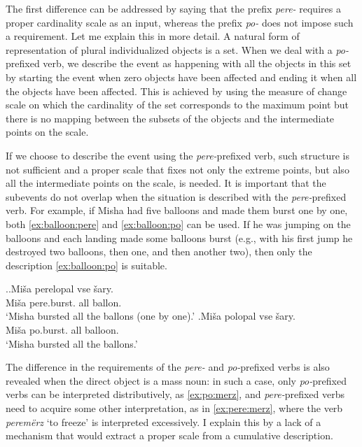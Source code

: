 The first difference can be addressed by saying that the prefix \textit{pere-} requires a proper cardinality scale as an input, whereas the prefix \textit{po-} does not impose such a requirement. Let me explain this in more detail. A natural form of representation of plural individualized objects is a set. When we deal with a \textit{po-}prefixed verb, we describe the event as happening with all the objects in this set by starting the event when zero objects have been affected and ending it when all the objects have been affected. This is achieved by using the measure of change scale on which the cardinality of the set corresponds to the maximum point but there is no mapping between the subsets of the objects and the intermediate points on the scale.

If we choose to describe the event using the \textit{pere-}prefixed verb, such structure is not sufficient and a proper scale that fixes not only the extreme points, but also all the intermediate points on the scale, is needed. It is important that the subevents do not overlap when the situation is described with the \textit{pere-}prefixed verb. For example, if Misha had five balloons and made them burst one by one, both \ref{ex:balloon:pere} and \ref{ex:balloon:po} can be used. If he was jumping on the balloons and each landing made some balloons burst (e.g., with his first jump he destroyed two balloons, then one, and then another two), then only the description \ref{ex:balloon:po} is suitable.

\ex.\ag.\label{ex:balloon:pere}Mi\v{s}a perelopal vse \v{s}ary.\\
Mi\v{s}a pere.burst. all ballon.\\
\vspace{0.5em}
`Misha bursted all the ballons (one by one).'
\bg.\label{ex:balloon:po}Mi\v{s}a polopal vse \v{s}ary.\\
Mi\v{s}a po.burst. all balloon.\\
\vspace{0.5em}
`Misha bursted all the ballons.'

The difference in the requirements of the \textit{pere-} and \textit{po-}prefixed verbs is also revealed when the direct object is a mass noun: in such a case, only \textit{po-}prefixed verbs can be interpreted distributively, as \ref{ex:po:merz}, and \textit{pere-}prefixed verbs need to acquire some other interpretation, as in \ref{ex:pere:merz}, where the verb \textit{perem\"{e}rz} `to freeze' is interpreted excessively. I explain this by a lack of a mechanism that would extract a proper scale from a cumulative description.

